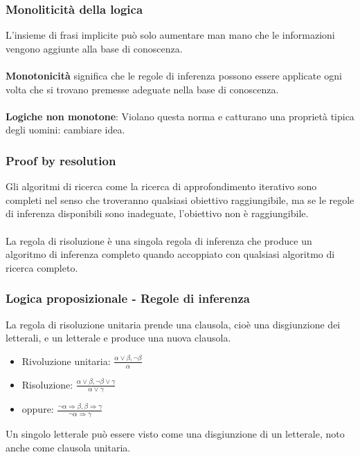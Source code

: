 \documentclass[../main.tex]{subfiles}
\begin{document}
	\subsubsection{Monoliticità della logica}
	L'insieme di frasi implicite può solo aumentare man mano che le informazioni vengono aggiunte alla base di conoscenza.\\\\
	\textbf{Monotonicità} significa che le regole di inferenza possono essere applicate ogni volta che si trovano premesse adeguate nella base di conoscenza.\\\\
	\textbf{Logiche non monotone}: Violano questa norma e catturano una proprietà tipica degli uomini: cambiare idea.
	\subsubsection{Proof by resolution}
	Gli algoritmi di ricerca come la ricerca di approfondimento iterativo sono completi nel senso che troveranno qualsiasi obiettivo raggiungibile, ma se le regole di inferenza disponibili sono inadeguate, l'obiettivo non è raggiungibile.\\\\
	La regola di risoluzione è una singola regola di inferenza che produce un algoritmo di inferenza completo quando accoppiato con qualsiasi algoritmo di ricerca completo.
	\subsubsection{Logica proposizionale - Regole di inferenza}
	La regola di risoluzione unitaria prende una clausola, cioè una disgiunzione dei letterali, e un letterale e produce una nuova clausola.
	\begin{itemize}
		\item Rivoluzione unitaria: $\frac{\alpha \vee \beta , \neg \beta}{\alpha}$
		\item Risoluzione: $\frac{\alpha \vee \beta , \neg \beta \vee \gamma}{\alpha \vee \gamma}$
		\item oppure: $\frac{\neg \alpha \Rightarrow \beta , \beta \Rightarrow \gamma}{\neg \alpha \Rightarrow \gamma}$
	\end{itemize}
	Un singolo letterale può essere visto come una disgiunzione di un letterale, noto anche come clausola unitaria.
\end{document}
